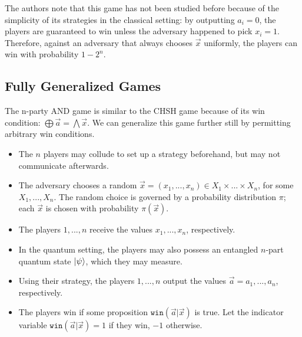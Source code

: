 The authors note that this game has not been studied before because of the simplicity of its strategies in the classical setting: by outputting $a_i=0$, the players are guaranteed to win unless the adversary happened to pick $x_i=1$. Therefore, against an adversary that always chooses $\vec{x}$ uniformly, the players can win with probability $1-2^n$.





\subsection{Fully Generalized Games}

The n-party AND game is similar to the CHSH game because of its win condition: $\bigoplus \vec{a} = \bigwedge \vec{x}$. We can generalize this game further still by permitting arbitrary win conditions.

\begin{itemize}
\item{The $n$ players may collude to set up a strategy beforehand, but may not communicate afterwards.}
\item{The adversary chooses a random $\vec{x}=(x_1, ..., x_n) \in X_1 \times ... \times X_n$, for some $X_1, ..., X_n$. The random choice is governed by a probability distribution $\pi$; each $\vec{x}$ is chosen with probability $\pi(\vec{x})$.}
\item{The players $1, ..., n$ receive the values $x_1, ..., x_n$, respectively.}
\item{In the quantum setting, the players may also possess an entangled $n$-part quantum state $\ket{\psi}$, which they may measure.}
\item{Using their strategy, the players $1, ..., n$ output the values $\vec{a} = a_1, ..., a_n$, respectively.}
\item{The players win if some proposition $\texttt{win}(\vec{a} | \vec{x})$ is true. Let the indicator variable $\texttt{win}(\vec{a}|\vec{x}) = 1$ if they win, $-1$ otherwise.}
\end{itemize}

